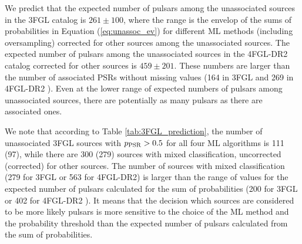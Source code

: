 We predict that the expected number of pulsars among the unassociated sources in the 3FGL catalog
is $261 \pm 100$, where the range is the envelop of the sums of probabilities in Equation (\ref{eq:unassoc_ev})
for different ML methods (including oversampling) corrected for other sources among the unassociated sources.
The expected number of pulsars among the unassociated sources in the 4FGL-DR2  catalog corrected for other sources is 
$459 \pm 201$.
These numbers are larger than the number of associated PSRs without missing values (164 in 3FGL and 269 in 4FGL-DR2 ).
Even at the lower range of expected numbers of pulsars among unassociated sources, there are potentially as many pulsars
as there are associated ones.

We note that according to Table \ref{tab:3FGL_prediction}, the number of unassociated 3FGL sources 
with $p_{\rm PSR} > 0.5$ for all four ML algorithms is 111 (97), while there are 300 (279) sources with mixed classification,
uncorrected (corrected) for other sources.
The number of sources with mixed classification (279 for 3FGL or 563 for 4FGL-DR2)
is larger than the range of values for the expected number of pulsars calculated for the sum of probabilities 
(200 for 3FGL or 402 for 4FGL-DR2 ).
It means that the decision which sources are considered to be more likely pulsars is more sensitive to the choice of the ML method
and the probability threshold than the expected number of pulsars calculated from the sum of probabilities.

